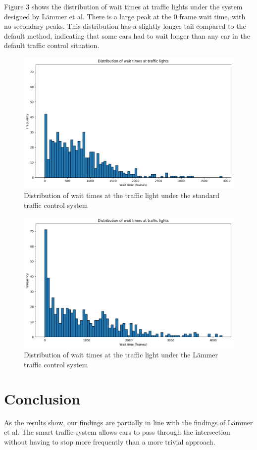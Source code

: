 \documentclass{article}
\begin{document}
Figure 3 shows the distribution of wait times at traffic lights under the system designed by L{\"a}mmer et al. There is a large peak at the 0 frame wait time, with no secondary peaks. This distribution has a slightly longer tail compared to the default method, indicating that some cars had to wait longer than any car in the default traffic control situation.
\begin{figure}[h!]
\includegraphics[width=12cm]{img/default_1wait_time.png}
\caption{Distribution of wait times at the traffic light under the standard traffic control system}
\end{figure}
\begin{figure}[h!]
\includegraphics[width=12cm]{img/Laemmer_1wait_time.png}
\caption{Distribution of wait times at the traffic light under the L{\"a}mmer traffic control system}
\end{figure}

\FloatBarrier

\section{Conclusion}
As the results show, our findings are partially in line with the findings of L{\"a}mmer et al. The smart traffic system allows cars to pass through the intersection without having to stop more frequently than a more trivial approach.
\end{document}
